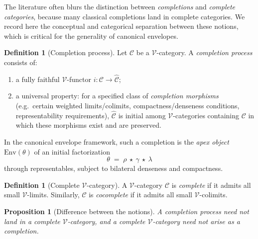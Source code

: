 \documentclass[11pt]{article}
\theoremstyle{plain}
\newtheorem{proposition}[theorem]{Proposition}
\theoremstyle{definition}
\newtheorem{definition}[theorem]{Definition}
\theoremstyle{remark}
\newcommand{\V}{\mathcal{V}}
\newcommand{\Env}{\mathrm{Env}}
\begin{document}
The literature often blurs the distinction between \emph{completions} and \emph{complete categories}, because many classical completions land in complete categories. We record here the conceptual and categorical separation between these notions, which is critical for the generality of canonical envelopes.

\begin{definition}[Completion process]
Let $\mathcal{C}$ be a $\V$-category.  
A \emph{completion process} consists of:
\begin{enumerate}
\item a fully faithful $\V$-functor $i : \mathcal{C} \to \widehat{\mathcal{C}}$;
\item a universal property: for a specified class of \emph{completion morphisms} (e.g.\ certain weighted limits/colimits, compactness/denseness conditions, representability requirements), $\widehat{\mathcal{C}}$ is initial among $\V$-categories containing $\mathcal{C}$ in which these morphisms exist and are preserved.
\end{enumerate}
In the canonical envelope framework, such a completion is the \emph{apex object} $\Env(\theta)$ of an initial factorization
\[
\theta \;=\; \rho \ \star\ \gamma \ \star\ \lambda
\]
through representables, subject to bilateral denseness and compactness.
\end{definition}

\begin{definition}[Complete $\V$-category]
A $\V$-category $\mathcal{C}$ is \emph{complete} if it admits all small $\V$-limits.  
Similarly, $\mathcal{C}$ is \emph{cocomplete} if it admits all small $\V$-colimits.
\end{definition}

\begin{proposition}[Difference between the notions]\label{prop:completion-vs-complete}
A completion process need not land in a complete $\V$-category, and a complete $\V$-category need not arise as a completion.
\end{proposition}
\end{document}
